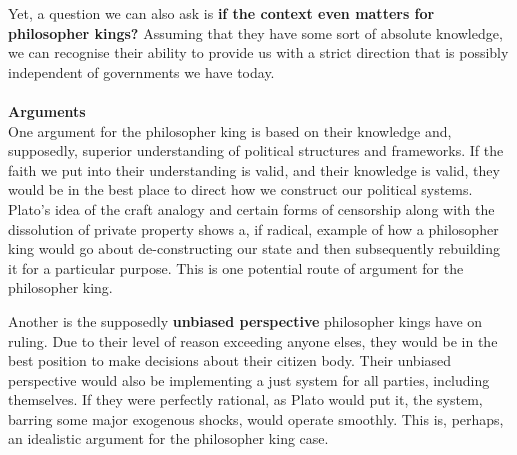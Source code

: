 \documentclass[12pt, letterpaper]{article}
\begin{document}
Yet, a question we can also ask is \textbf{if the context even matters for philosopher kings?} Assuming that they have some sort of absolute knowledge, we can recognise their ability to provide us with a strict direction that is possibly independent of governments we have today.\\\\
\textbf{Arguments}\\
One argument for the philosopher king is based on their knowledge and, supposedly, superior understanding of political structures and frameworks. If the faith we put into their understanding is valid, and their knowledge is valid, they would be in the best place to direct how we construct our political systems. Plato's idea of the craft analogy and certain forms of censorship along with the dissolution of private property shows a, if radical, example of how a philosopher king would go about de-constructing our state and then subsequently rebuilding it for a particular purpose. This is one potential route of argument for the philosopher king.

Another is the supposedly \textbf{unbiased perspective} philosopher kings have on ruling. Due to their level of reason exceeding anyone elses, they would be in the best position to make decisions about their citizen body. Their unbiased perspective would also be implementing a just system for all parties, including themselves. If they were perfectly rational, as Plato would put it, the system, barring some major exogenous shocks, would operate smoothly. This is, perhaps, an idealistic argument for the philosopher king case.
\end{document}
